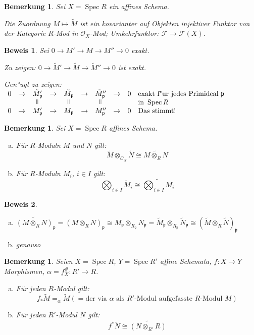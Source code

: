 \documentclass[paper = A4, fontsize=12pt, numbers=noendperiod, chapterprefix=true]{scrbook}
\theoremstyle{break}
\newtheorem{Bem}[Def]{Bemerkung}
\theoremstyle{nonumberbreak}
\newtheorem{bew}{Beweis}
\theoremstyle{nonumberplain}
\newcommand{\verteq}{\rotatebox{90}{$=$}}
\DeclareMathOperator{\Spec}{Spec}
\newcommand{\calF}{\mathcal{F}}
\newcommand{\calO}{\mathcal{O}}
\newcommand{\p}{\mathfrak{p}} %
\begin{document}
\begin{Bem}\label{9.5}
Sei $X = \Spec R$ ein affines Schema.

Die Zuordnung $M \mapsto \tilde M$ ist ein kovarianter auf Objekten injektiver Funktor von der Kategorie $R$-Mod in $\calO_X$-Mod; Umkehrfunktor: $\calF \to \calF(X)$.
\end{Bem}

\begin{bew}
Sei $0 \to M' \to M \to M'' \to 0$ exakt.

\emph{Zu zeigen}: $0 \to \tilde M' \to \tilde M \to \tilde M'' \to 0$ ist exakt.

\emph{Gen"ugt zu zeigen}: $\begin{array}{cccccccccl} 0 &\to& \tilde M_\p' &\to& \tilde M_\p &\to& \tilde M_\p'' &\to& 0 & \text{exakt f"ur jedes Primideal } \p\\
	&&\verteq&&\verteq&&\verteq&&&\text{in } \Spec R \\
	0 &\to& M_\p' &\to& M_\p &\to& M_\p'' &\to& 0 & \text{Das stimmt!}\end{array}$
\end{bew}

\begin{Bem}
Sei $X = \Spec R$ affines Schema.
\begin{enumerate}[a)]
\item
	F\"ur $R$-Moduln $M$ und $N$ gilt:
		\[\tilde M \otimes_{\calO_X} \tilde N \cong \widetilde{M \otimes_R N}\]
\item
	F\"ur $R$-Moduln $M_i$, $i \in I$ gilt:
		\[ \bigotimes_{i\in I} \tilde M_i \cong \widetilde{\bigotimes_{i \in I} M_i} \]
\end{enumerate}\end{Bem}

\begin{bew}\begin{enumerate}[a)]
\item
	$\widetilde{(M \otimes_R N)}_\p = (M \otimes_R N)_\p \cong M_\p \otimes_{R_\p} N_\p = \tilde M_\p \otimes_{R_\p} \tilde N_\p \cong (\tilde M \otimes_R \tilde N)_\p$
\item
	genauso
\end{enumerate}\end{bew}

\begin{Bem}\label{9.7}
Seien $X= \Spec R$, $Y = \Spec R'$ affine Schemata, $f: X \to Y$ Morphismen, $\alpha = f_X^\#: R' \to R$.
\begin{enumerate}[a)]
\item
	F\"ur jeden $R$-Modul gilt:
		\[ f_*\tilde M = _\alpha\tilde M (= \text{der via } \alpha \text{ als } R' \text{-Modul aufgefasste } R \text{-Modul } M) \]
\item\label{9.7b}
	F\"ur jeden $R'$-Modul $N$ gilt:
		\[ f^*\tilde N \cong \widetilde{(N \otimes_{R'} R)} \]
\end{enumerate}\end{Bem}
\end{document}
